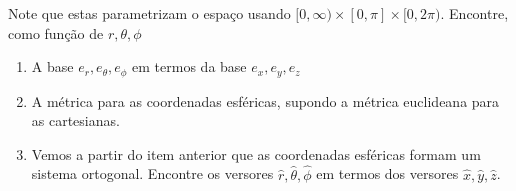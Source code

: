 \begin{enumerate}
        Note que estas parametrizam o espaço usando $[0,\infty)\times[0,\pi]
        \times[0,2\pi)$. Encontre, como função de $r,\theta,\phi$
        \begin{enumerate}
            \item
                A base $e_r,e_\theta,e_\phi$ em termos da base $e_x,e_y,e_z$
            \item
                A métrica para as coordenadas esféricas, supondo a métrica
                euclideana para as cartesianas.
            \item
                Vemos a partir do item anterior que as coordenadas esféricas
                formam um sistema ortogonal. Encontre os versores $\hat r,\hat
                \theta,\hat\phi$ em termos dos versores $\hat x, \hat y,\hat z$.
        \end{enumerate}
\end{enumerate}
